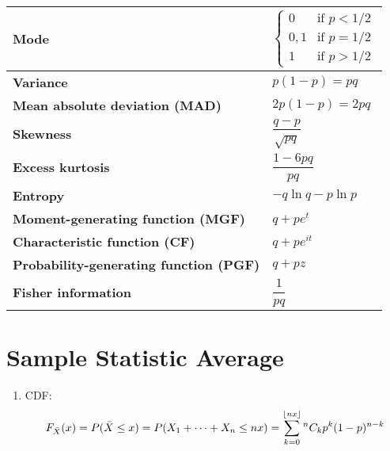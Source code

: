 \begin{customTableWrapper}{2}
\begin{longtable}{|m{6cm}|p{9cm}|}
    \textbf{Mode} & 
    ${\displaystyle {\begin{cases}0&{\text{if }}p<1/2\\0,1&{\text{if }}p=1/2\\1&{\text{if }}p>1/2\end{cases}}}$
    \\ \hline

    \textbf{Variance} &
    ${\displaystyle p(1-p)=pq}$
    \\ \hline

    \textbf{Mean absolute deviation (MAD)} &
    ${\displaystyle 2p(1-p)=2pq}$
    \\[1ex] \hline

    \textbf{Skewness} &
    ${\displaystyle {\dfrac {q-p}{\sqrt {pq}}}}$
    \\ \hline

    \textbf{Excess kurtosis} &
    ${\displaystyle {\dfrac {1-6pq}{pq}}}$
    \\ \hline

    \textbf{Entropy} &
    ${\displaystyle -q\ln q-p\ln p}$
    \\[1ex] \hline

    \textbf{Moment-generating function (MGF)} &
    ${\displaystyle q+pe^{t}}$
    \\[1ex] \hline

    \textbf{Characteristic function (CF)} &
    ${\displaystyle q+pe^{it}}$
    \\[1ex] \hline

    \textbf{Probability-generating function (PGF)} &
    ${\displaystyle q+pz}$
    \\[1ex] \hline

    \textbf{Fisher information} &
    ${\displaystyle {\dfrac {1}{pq}}}$
    \\[1ex] \hline


\end{longtable}
\end{customTableWrapper}

\section{Sample Statistic Average \cite{ism-1}} \label{Bernoulli Distribution: Sample Statistic Average}

\begin{enumerate}
    \item CDF:
    \[
        F_{\bar{X}}(x)
        = P(\bar{X} \leq x)
        = P(X_1 + \cdots + X_n \leq nx)
        = \displaystyle\sum_{k=0}^{\left \lfloor nx \right \rfloor} {^n}C_k p^k (1-p)^{n-k}
    \]

\end{enumerate}

